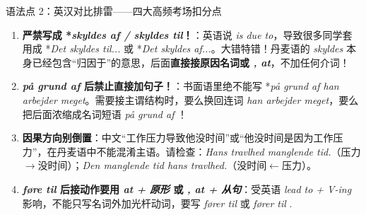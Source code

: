 \begin{grammatikbox}{语法点 2：英汉对比排雷——四大高频考场扣分点}
\begin{enumerate}
  \item \textbf{严禁写成 *\textit{skyldes af / skyldes til}！}：英语说 \textit{is due to}，导致很多同学套用成 *\textit{Det skyldes til...} 或 *\textit{Det skyldes af...}。大错特错！丹麦语的 \textit{skyldes} 本身已经包含“归因于”的意思，后面\textbf{直接接原因名词或 \textit{, at}}，不加任何介词！
  \item \textbf{\textit{på grund af} 后禁止直接加句子！}：书面语里绝不能写 *\textit{på grund af han arbejder meget}。需要接主谓结构时，要么换回连词 \textit{ han arbejder meget}，要么把后面浓缩成名词短语 \textit{på grund af }！
  \item \textbf{因果方向别倒置}：中文“工作压力导致他没时间”或“他没时间是因为工作压力”，在丹麦语中不能混淆主语。请检查：\textit{Hans travlhed  manglende tid.}（压力$\rightarrow$没时间）；\textit{Den manglende tid  hans travlhed.}（没时间$\leftarrow$压力）。
  \item \textbf{\textit{føre til} 后接动作要用 \textit{at + 原形} 或 \textit{, at + 从句}}：受英语 \textit{lead to + V-ing} 影响，不能只写名词外加光杆动词，要写 \textit{fører til } 或 \textit{fører til }.
\end{enumerate}
\end{grammatikbox}


